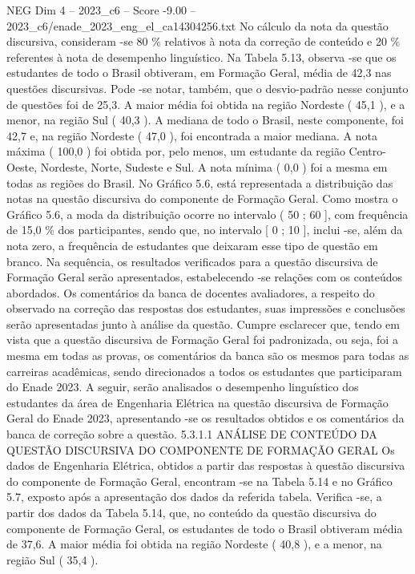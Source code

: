\begin{textsample}{NEG Dim 4 – 2023\_c6 – Score -9.00 – 2023\_c6/enade\_2023\_eng\_el\_ca14304256.txt}
No cálculo da nota da questão discursiva, consideram -se 80 \% relativos à nota da correção de conteúdo e 20 \% referentes à nota de desempenho linguístico.
Na Tabela 5.13, observa -se que os estudantes de todo o Brasil obtiveram, em Formação Geral, média de 42,3 nas questões discursivas.
Pode -se notar, também, que o desvio-padrão nesse conjunto de questões foi de 25,3.
A maior média foi obtida na região Nordeste ( 45,1 ), e a menor, na região Sul ( 40,3 ).
A mediana de todo o Brasil, neste componente, foi 42,7 e, na região Nordeste ( 47,0 ), foi encontrada a maior mediana.
A nota máxima ( 100,0 ) foi obtida por, pelo menos, um estudante da região Centro-Oeste, Nordeste, Norte, Sudeste e Sul.
A nota mínima ( 0,0 ) foi a mesma em todas as regiões do Brasil.
No Gráfico 5.6, está representada a distribuição das notas na questão discursiva do componente de Formação Geral.
Como mostra o Gráfico 5.6, a moda da distribuição ocorre no intervalo ( 50 ; 60 ], com frequência de 15,0 \% dos participantes, sendo que, no intervalo [ 0 ; 10 ], inclui -se, além da nota zero, a frequência de estudantes que deixaram esse tipo de questão em branco.
Na sequência, os resultados verificados para a questão discursiva de Formação Geral serão apresentados, estabelecendo -se relações com os conteúdos abordados.
Os comentários da banca de docentes avaliadores, a respeito do observado na correção das respostas dos estudantes, suas impressões e conclusões serão apresentadas junto à análise da questão.
Cumpre esclarecer que, tendo em vista que a questão discursiva de Formação Geral foi padronizada, ou seja, foi a mesma em todas as provas, os comentários da banca são os mesmos para todas as carreiras acadêmicas, sendo direcionados a todos os estudantes que participaram do Enade 2023.
A seguir, serão analisados o desempenho linguístico dos estudantes da área de Engenharia Elétrica na questão discursiva de Formação Geral do Enade 2023, apresentando -se os resultados obtidos e os comentários da banca de correção sobre a questão. 5.3.1.1 ANÁLISE DE CONTEÚDO DA QUESTÃO DISCURSIVA DO COMPONENTE DE FORMAÇÃO GERAL Os dados de Engenharia Elétrica, obtidos a partir das respostas à questão discursiva do componente de Formação Geral, encontram -se na Tabela 5.14 e no Gráfico 5.7, exposto após a apresentação dos dados da referida tabela.
Verifica -se, a partir dos dados da Tabela 5.14, que, no conteúdo da questão discursiva do componente de Formação Geral, os estudantes de todo o Brasil obtiveram média de 37,6.
A maior média foi obtida na região Nordeste ( 40,8 ), e a menor, na região Sul ( 35,4 ).

\end{textsample}
